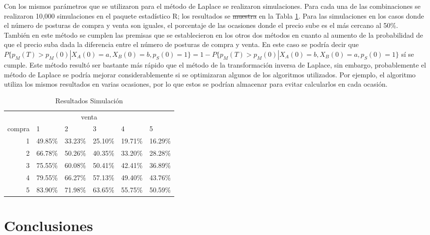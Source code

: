 \documentclass[11pt]{article}
\numberwithin{equation}{section} %
\providecommand{\DIFadd}[1]{{\protect\color{blue}\uwave{#1}}} %
\providecommand{\DIFdel}[1]{{\protect\color{red}\sout{#1}}}                      %
\providecommand{\DIFaddbegin}{} %
\providecommand{\DIFaddend}{} %
\providecommand{\DIFdelbegin}{} %
\providecommand{\DIFdelend}{} %
\begin{document}
Con los mismos parámetros que se utilizaron para el método de Laplace se realizaron simulaciones. Para cada una de las combinaciones se realizaron 10,000 simulaciones en el paquete estadístico R; los resultados se \DIFdelbegin \DIFdel{muestra }\DIFdelend \DIFaddbegin \DIFadd{muestran }\DIFaddend en la Tabla \ref{tab:ressim}. Para las simulaciones en los casos donde el número de posturas de compra y venta son iguales, el porcentaje de las ocasiones donde el precio sube es el más cercano al 50\%. También en este método se cumplen las premisas que se establecieron en los otros dos métodos en cuanto al aumento de la probabilidad de que el precio suba dada la diferencia entre el número de posturas de compra y venta. En este caso se podría decir que $P\{p_M(T)>p_M(0)|X_A(0)=a,X_B(0)=b,p_S(0)=1\}=1-P\{p_M(T)>p_M(0)|X_A(0)=b,X_B(0)=a,p_S(0)=1\}$ sí se cumple. Este método resultó ser bastante más rápido que el método de la transformación inversa de Laplace, sin embargo, probablemente el método de Laplace se podría mejorar considerablemente si se optimizaran algunos de los algoritmos utilizados. Por ejemplo, el algoritmo utiliza los mismos resultados en varias ocasiones, por lo que estos se podrían almacenar para evitar calcularlos en cada ocasión.

\begin{table}[htbp]
\centering
\caption{Resultados Simulación}
\begin{tabular}{r|p{1.5cm}|p{1.5cm}|p{1.5cm}|p{1.5cm}|p{1.5cm}|}
\multicolumn{6}{c}{venta}\\
\cline{2-6}
compra & 1& 2 & 3 & 4 & 5 \\
\cline{2-6}
1 & 49.85\% & 33.23\% & 25.10\% & 19.71\% & 16.29\% \\
2 & 66.78\% & 50.26\% & 40.35\% & 33.20\% & 28.28\% \\
3 & 75.55\% & 60.08\% & 50.41\% & 42.41\% & 36.89\% \\
4 & 79.55\% & 66.27\% & 57.13\% & 49.40\% & 43.76\% \\
5 & 83.90\% & 71.98\% & 63.65\% & 55.75\% & 50.59\% \\
\cline{2-6}
\end{tabular}%
\label{tab:ressim}%
\end{table}%

\clearpage

\section{Conclusiones}
\end{document}
